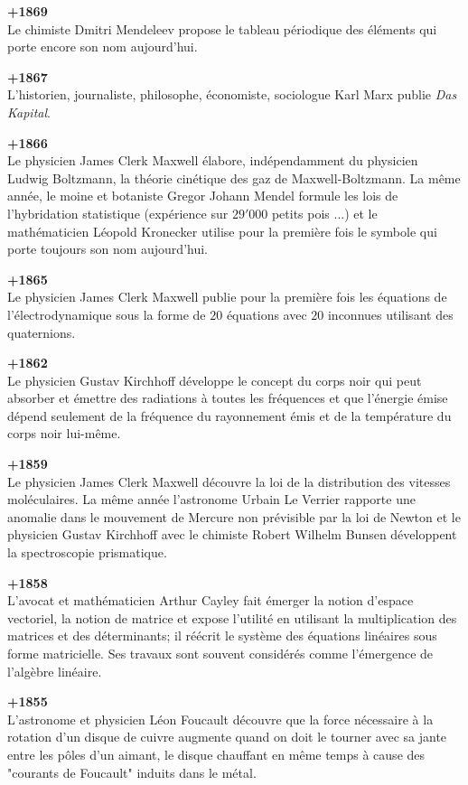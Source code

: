 \textbf{+1869}\\
Le chimiste Dmitri Mendeleev propose le tableau périodique des éléments qui porte encore son nom aujourd'hui.

\textbf{+1867}\\
L'historien, journaliste, philosophe, économiste, sociologue Karl Marx publie \textit{Das Kapital}.

\textbf{+1866}\\
Le physicien James Clerk Maxwell élabore, indépendamment du physicien Ludwig Boltzmann, la théorie cinétique des gaz de Maxwell-Boltzmann. La même année, le moine et botaniste Gregor Johann Mendel formule les lois de l'hybridation statistique (expérience sur $29'000$ petits pois ...) et le mathématicien Léopold Kronecker utilise pour la première fois le symbole qui porte toujours son nom aujourd'hui.

\textbf{+1865}\\
Le physicien James Clerk Maxwell publie pour la première fois les équations de l'électrodynamique sous la forme de $20$ équations avec $20$ inconnues utilisant des quaternions.

\textbf{+1862}\\
Le physicien Gustav Kirchhoff développe le concept du corps noir qui peut absorber et émettre des radiations à toutes les fréquences et que l'énergie émise dépend seulement de la fréquence du rayonnement émis et de la température du corps noir lui-même.

\textbf{+1859}\\
Le physicien James Clerk Maxwell découvre la loi de la distribution des vitesses moléculaires. La même année l'astronome Urbain Le Verrier rapporte une anomalie dans le mouvement de Mercure non prévisible par la loi de Newton et le physicien Gustav Kirchhoff avec le chimiste Robert Wilhelm Bunsen développent la spectroscopie prismatique.

\textbf{+1858}\\
L'avocat et mathématicien Arthur Cayley fait émerger la notion d'espace vectoriel, la notion de matrice et expose l'utilité en utilisant la multiplication des matrices et des déterminants; il réécrit le système des équations linéaires sous forme matricielle. Ses travaux sont souvent considérés comme l'émergence de l'algèbre linéaire.

\textbf{+1855}\\
L'astronome et physicien Léon Foucault découvre que la force nécessaire à la rotation d'un disque de cuivre augmente quand on doit le tourner avec sa jante entre les pôles d'un aimant, le disque chauffant en même temps à cause des "courants de Foucault" induits dans le métal.

